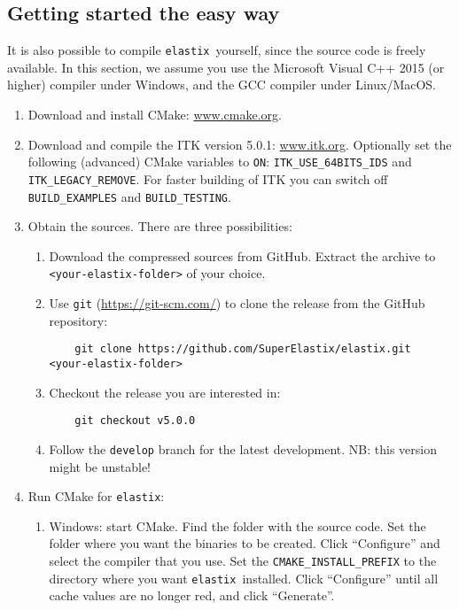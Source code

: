 \documentclass[]{report}
\newcommand{\elastix}{\texttt{elastix}}
\begin{document}
\subsection{Getting started the easy way}

It is also possible to compile \elastix\ yourself, since the source
code is freely available. In this section, we assume you use the
Microsoft Visual C++ 2015 (or higher) compiler under Windows, and
the GCC compiler under Linux/MacOS.

\begin{enumerate}
\item Download and install CMake: \url{www.cmake.org}.

\item Download and compile the ITK version 5.0.1: \url{www.itk.org}.
    Optionally set the following (advanced) CMake variables to
    \texttt{ON}: \texttt{ITK\_USE\_64BITS\_IDS}
    and \texttt{ITK\_LEGACY\_REMOVE}. For faster building of ITK
    you can switch off \texttt{BUILD\_EXAMPLES} and
    \texttt{BUILD\_TESTING}.

\item Obtain the sources. There are three possibilities:
  \begin{enumerate}
  \item Download the compressed sources from GitHub. Extract the
      archive to \texttt{<your-elastix-folder>} of your choice.
  \item Use \texttt{git} (\url{https://git-scm.com/})
      to clone the release from the GitHub repository:
    \begin{verbatim}
    git clone https://github.com/SuperElastix/elastix.git <your-elastix-folder>
    \end{verbatim}
  \item Checkout the release you are interested in:
    \begin{verbatim}
    git checkout v5.0.0
    \end{verbatim}
  \item Follow the \texttt{develop} branch for the latest development.
    NB: this version might be unstable!
  \end{enumerate}

\item Run CMake for \elastix:
    \begin{enumerate}
    \item Windows: start CMake. Find the folder with the
        source code. Set the folder where you want the binaries to be
        created. Click ``Configure'' and select the compiler that you
        use. Set the \texttt{CMAKE\_INSTALL\_PREFIX} to the directory
        where you want \elastix\ installed. Click ``Configure'' until
        all cache values are no longer red, and click ``Generate''.


\end{enumerate}
\end{enumerate}
\end{document}
